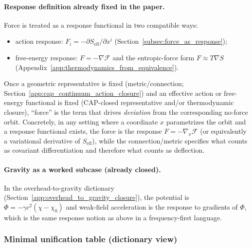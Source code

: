 \paragraph{Response definition already fixed in the paper.}
Force is treated as a response functional in two compatible ways:
\begin{itemize}
\item action response: $F_i=-\partial S_{\mathrm{eff}}/\partial x^i$ (Section~\ref{subsec:force_as_response});
\item free-energy response: $F=-\nabla \mathcal{F}$ and the entropic-force form $F\approx T\nabla S$ (Appendix~\ref{app:thermodynamics_from_equivalence}).
\end{itemize}

\begin{proposition}
\label{prop:force_as_deflection_relative_to_connection}
\InterfaceTag Once a geometric representative is fixed (metric/connection; Section~\ref{app:cap_continuum_action_closure}) and an effective action or free-energy functional is fixed (CAP-closed representative and/or thermodynamic closure),
``force'' is the term that drives \emph{deviation} from the corresponding no-force orbit.
Concretely, in any setting where a coordinate $x$ parametrizes the orbit and a response functional exists, the force is the response $F=-\nabla_x\mathcal{F}$ (or equivalently a variational derivative of $S_{\mathrm{eff}}$), while the connection/metric specifies what counts as covariant differentiation and therefore what counts as deflection.
\end{proposition}

\paragraph{Gravity as a worked subcase (already closed).}
\InterfaceTag In the overhead-to-gravity dictionary (Section~\ref{app:overhead_to_gravity_closure}),
the potential is $\Phi=-\gamma c^2(\chi-\chi_0)$ and weak-field acceleration is the response to gradients of $\Phi$, which is the same response notion as above in a frequency-first language.

\subsubsection{Minimal unification table (dictionary view)}
